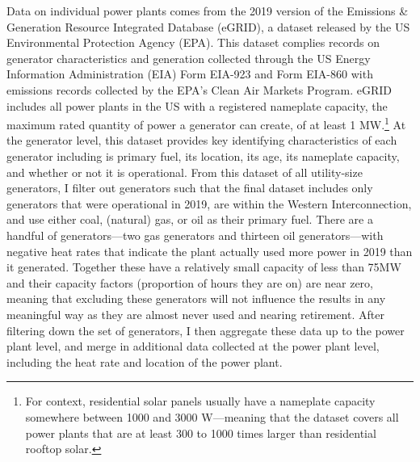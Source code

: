 Data on individual power plants comes from the 2019 version of the Emissions \& Generation Resource Integrated Database (eGRID), a dataset released by the US Environmental Protection Agency (EPA). This dataset complies records on generator characteristics and generation collected through the US Energy Information Administration (EIA) Form EIA-923 and Form EIA-860 with emissions records collected by the EPA's Clean Air Markets Program. eGRID includes all power plants in the US with a registered nameplate capacity, the maximum rated quantity of power a generator can create, of at least 1 MW.\footnote{For context, residential solar panels usually have a nameplate capacity somewhere between 1000 and 3000 W---meaning that the dataset covers all power plants that are at least 300 to 1000 times larger than residential rooftop solar.} At the generator level, this dataset provides key identifying characteristics of each generator including is primary fuel, its location, its age, its nameplate capacity, and whether or not it is operational. From this dataset of all utility-size generators, I filter out generators such that the final dataset includes only generators that were operational in 2019, are within the Western Interconnection, and use either coal, (natural) gas, or oil as their primary fuel. There are a handful of generators---two gas generators and thirteen oil generators---with negative heat rates that indicate the plant actually used more power in 2019 than it generated. Together these have a relatively small capacity of less than 75MW and their capacity factors (proportion of hours they are on) are near zero, meaning that excluding these generators will not influence the results in any meaningful way as they are almost never used and nearing retirement. After filtering down the set of generators, I then aggregate these data up to the power plant level, and merge in additional data collected at the power plant level, including the heat rate and location of the power plant.

